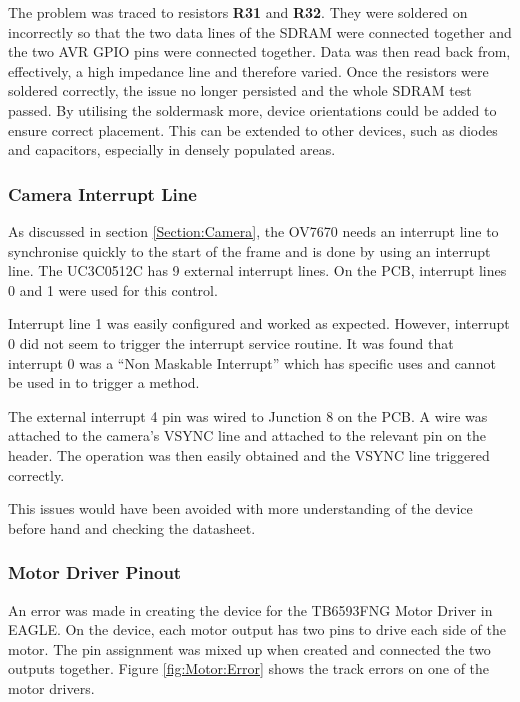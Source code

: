 The problem was traced to resistors \textbf{R31} and \textbf{R32}. They were soldered on incorrectly so that the two data lines of the SDRAM were connected together and the two AVR GPIO pins were connected together. Data was then read back from, effectively, a high impedance line and therefore varied. Once the resistors were soldered correctly, the issue no longer persisted and the whole SDRAM test passed. By utilising the soldermask more, device orientations could be added to ensure correct placement. This can be extended to other devices, such as diodes and capacitors, especially in densely populated areas. 

\subsubsection{Camera Interrupt Line}

As discussed in section \ref{Section:Camera}, the OV7670 needs an interrupt line to synchronise quickly to the start of the frame and is done by using an interrupt line. The UC3C0512C has 9 external interrupt lines. On the PCB, interrupt lines 0 and 1 were used for this control.

Interrupt line 1 was easily configured and worked as expected. However, interrupt 0 did not seem to trigger the interrupt service routine. It was found that interrupt 0 was a ``Non Maskable Interrupt'' which has specific uses and cannot be used in to trigger a method. 

The external interrupt 4 pin was wired to Junction 8 on the PCB. A wire was attached to the camera's VSYNC line and attached to the relevant pin on the header. The operation was then easily obtained and the VSYNC line triggered correctly.

This issues would have been avoided with more understanding of the device before hand and checking the datasheet.


\subsubsection{Motor Driver Pinout}

An error was made in creating the device for the TB6593FNG Motor Driver in EAGLE. On the device, each motor output has two pins to drive each side of the motor. The pin assignment was mixed up when created and connected the two outputs together. Figure \ref{fig:Motor:Error} shows the track errors on one of the motor drivers. 

